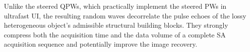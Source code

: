 Unlike
the steered \acp{QPW}, which practically implement
the steered \acp{PW} in
ultrafast \ac{UI},
the resulting random waves decorrelate
the pulse echoes of
the lossy heterogeneous object's admissible structural building blocks.
They strongly compress both
the acquisition time and
the data volume of
a complete \ac{SA} acquisition sequence and potentially improve
the image recovery.

